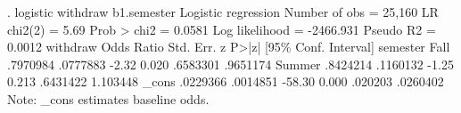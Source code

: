 . logistic withdraw b1.semester
{\smallskip}
Logistic regression                             Number of obs     =     25,160
                                                LR chi2(2)        =       5.69
                                                Prob > chi2       =     0.0581
Log likelihood =  -2466.931                     Pseudo R2         =     0.0012
{\smallskip}
    withdraw {\VBAR} Odds Ratio   Std. Err.      z    P>|z|     [95\% Conf. Interval]
    semester {\VBAR}
       Fall  {\VBAR}   .7970984   .0777883    -2.32   0.020     .6583301    .9651174
     Summer  {\VBAR}   .8424214   .1160132    -1.25   0.213     .6431422    1.103448
             {\VBAR}
       _cons {\VBAR}   .0229366   .0014851   -58.30   0.000      .020203    .0260402
Note: _cons estimates baseline odds.
{\smallskip}
